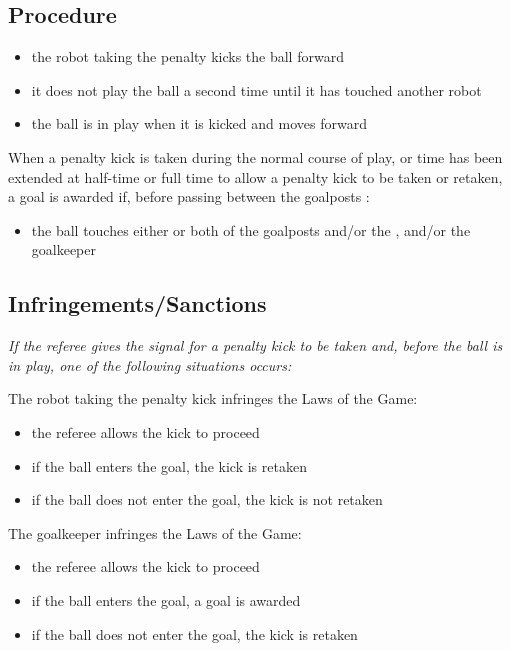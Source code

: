 \subsection{Procedure}
\begin{itemize}
\item the robot taking the penalty kicks the ball forward
\item it does not play the ball a second time until it has touched another robot
\item the ball is in play when it is kicked and moves forward
\end{itemize}

When a penalty kick is taken during the normal course of play, or time has been extended at half-time or full time to allow a penalty kick to be taken or retaken, a goal is awarded if, before passing between the goalposts :

\begin{itemize}
\item the ball touches either or both of the goalposts and/or the  , and/or the goalkeeper
\end{itemize}

\subsection{Infringements/Sanctions}
\textit{If the referee gives the signal for a penalty kick to be taken and, before the ball is in play, one of the following situations occurs:}

The robot taking the penalty kick infringes the Laws of the Game:

\begin{itemize}
\item the referee allows the kick to proceed
\item if the ball enters the goal, the kick is retaken
\item if the ball does not enter the goal, the kick is not retaken
\end{itemize}

The goalkeeper infringes the Laws of the Game:

\begin{itemize}
\item the referee allows the kick to proceed
\item if the ball enters the goal, a goal is awarded
\item if the ball does not enter the goal, the kick is retaken
\end{itemize}

